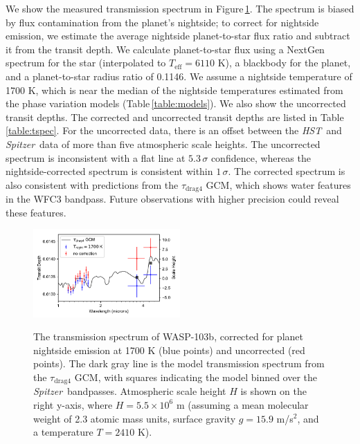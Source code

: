 \documentclass[twocolumn, trackchanges]{aastex61}
\newcommand{\project}[1]{\textsl{#1}}
\newcommand{\HST}{\project{HST}}
\newcommand{\Spitzer}{\project{Spitzer}}
\begin{document}
We show the measured transmission spectrum in Figure\,\ref{fig:tspec}.  The spectrum is biased by flux contamination from the planet's nightside; to correct for nightside emission, we estimate the average nightside planet-to-star flux ratio and subtract it from the transit depth. We calculate planet-to-star flux using a NextGen spectrum for the star (interpolated to $T_\mathrm{eff} = 6110$ K), a blackbody for the planet, and a planet-to-star radius ratio of 0.1146. We assume a nightside temperature of 1700 K, which is near the median of the nightside temperatures estimated from the phase variation models (Table\,\ref{table:models}). We also show the uncorrected transit depths. The corrected and uncorrected transit depths are listed in Table\,\ref{table:tspec}. For the uncorrected data, there is an offset between the \HST\ and \Spitzer\ data of more than five atmospheric scale heights.  The uncorrected spectrum is inconsistent with a flat line at $5.3\,\sigma$ confidence, whereas the nightside-corrected spectrum is consistent within $1\,\sigma$.  The corrected spectrum is also consistent with predictions from the $\tau_\mathrm{drag4}$ GCM, which shows water features in the WFC3 bandpass. Future observations with higher precision could reveal these features. %

\begin{figure}
\includegraphics[width = 0.5\textwidth]{fig10.pdf}
\label{fig:tspec}
\caption{The transmission spectrum of WASP-103b, corrected for planet nightside emission at 1700 K (blue points) and uncorrected (red points). The dark gray line is the model transmission spectrum from the $\tau_\mathrm{drag4}$ GCM, with squares indicating the model binned over the \Spitzer\ bandpasses. Atmospheric scale height $H$ is shown on the right y-axis, where $H = 5.5\times10^6$ m (assuming a mean molecular weight of 2.3 atomic mass units, surface gravity $g = 15.9$ m/s$^2$, and a temperature $T = 2410$ K).}
\end{figure}
\end{document}
